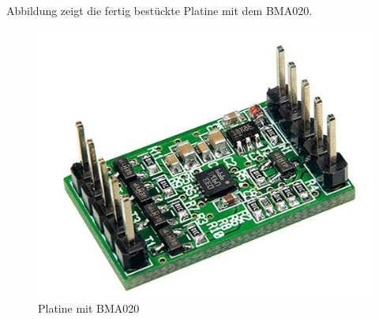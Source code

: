 Abbildung zeigt die fertig bestückte Platine mit dem BMA020.

\begin{figure}[!h] 
  \centering
     \includegraphics[scale=.4]{BilderAllgemein/Beschleunigungssensor.png}
  \caption{Platine mit BMA020 \citep{Bild_BMA020}}
  \label{Abb_HYT221}
\end{figure}